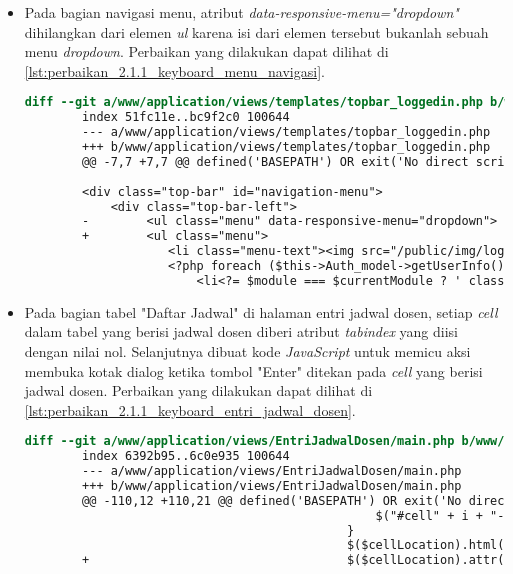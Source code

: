 \begin{itemize}
    \item Pada bagian navigasi menu, atribut \textit{data-responsive-menu="dropdown"} dihilangkan dari elemen \textit{ul} karena isi dari elemen tersebut bukanlah sebuah menu \textit{dropdown}. Perbaikan yang dilakukan dapat dilihat di \ref{lst:perbaikan_2.1.1_keyboard_menu_navigasi}.
    \begin{lstlisting}[frame=single, label={lst:perbaikan_2.1.1_keyboard_menu_navigasi}, language=diff, caption=Perbaikan Kriteria Sukses 2.1.1 - Penggunaan \textit{Keyboard} pada Menu Navigasi]
        diff --git a/www/application/views/templates/topbar_loggedin.php b/www/application/views/templates/topbar_loggedin.php
        index 51fc11e..bc9f2c0 100644
        --- a/www/application/views/templates/topbar_loggedin.php
        +++ b/www/application/views/templates/topbar_loggedin.php
        @@ -7,7 +7,7 @@ defined('BASEPATH') OR exit('No direct script access allowed');
        
        <div class="top-bar" id="navigation-menu">
            <div class="top-bar-left">
        -        <ul class="menu" data-responsive-menu="dropdown">
        +        <ul class="menu">
                    <li class="menu-text"><img src="/public/img/logo.png" class="textsized" alt="B"/></li>
                    <?php foreach ($this->Auth_model->getUserInfo()['modules'] as $module): ?>
                        <li<?= $module === $currentModule ? ' class="menu-active"' : '' ?>><a href="/<?= $module ?>"><?= $this->config->item('module-names')[$module] ?></a></li>
    \end{lstlisting}

    \item Pada bagian tabel "Daftar Jadwal" di halaman entri jadwal dosen, setiap \textit{cell} dalam tabel yang berisi jadwal dosen diberi atribut \textit{tabindex} yang diisi dengan nilai nol. Selanjutnya dibuat kode \textit{JavaScript} untuk memicu aksi membuka kotak dialog ketika tombol "Enter" ditekan pada \textit{cell} yang berisi jadwal dosen. Perbaikan yang dilakukan dapat dilihat di \ref{lst:perbaikan_2.1.1_keyboard_entri_jadwal_dosen}.
    \begin{lstlisting}[frame=single, label={lst:perbaikan_2.1.1_keyboard_entri_jadwal_dosen}, language=diff, caption=Perbaikan Kriteria Sukses 2.1.1 - Penggunaan \textit{Keyboard} pada Halaman Entri Jadwal Dosen]
        diff --git a/www/application/views/EntriJadwalDosen/main.php b/www/application/views/EntriJadwalDosen/main.php
        index 6392b95..6c0e935 100644
        --- a/www/application/views/EntriJadwalDosen/main.php
        +++ b/www/application/views/EntriJadwalDosen/main.php
        @@ -110,12 +110,21 @@ defined('BASEPATH') OR exit('No direct script access allowed');
                                                 $("#cell" + i + "-" +<?php echo $colIdx; ?>).remove();
                                             }
                                             $($cellLocation).html("<?php echo $dataHariIni->label ?>");
        +                                    $($cellLocation).attr("tabindex", "0");
         

\end{lstlisting}
\end{itemize}
